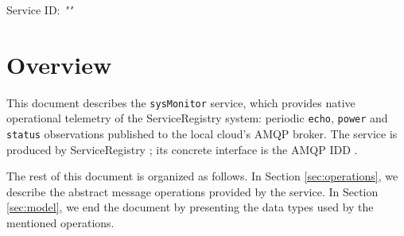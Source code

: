 \documentclass[a4paper]{arrowhead}
\begin{document}
\sloppy

\ArrowheadSetup

\begin{center}
  \vspace*{1cm}
  \huge{\arrowtitle}

  \vspace*{0.2cm}
  \LARGE{\arrowtype}
  \vspace*{1cm}

  \Large{Service ID: \textit{"\arrowid"}}

  \vspace*{\fill}


  \vspace*{1cm}
  \vspace*{\fill}

  \begin{abstract}
    This document describes the native \texttt{sysMonitor} service, version 1.0.0, produced by the ServiceRegistry core system of Arrowhead 5.2.2.
  \end{abstract}

  \vspace*{1cm}
\end{center}

\newpage

\tableofcontents
\newpage

\section{Overview}
\label{sec:overview}

This document describes the \texttt{sysMonitor} service, which provides native operational telemetry of the ServiceRegistry system: periodic \texttt{echo}, \texttt{power} and \texttt{status} observations published to the local cloud's AMQP broker.
The service is produced by ServiceRegistry \cite{sr-sysd}; its concrete interface is the AMQP IDD \cite{sr-sysMonitor-amqp-idd}.

The rest of this document is organized as follows.
In Section \ref{sec:operations}, we describe the abstract message operations provided by the service.
In Section \ref{sec:model}, we end the document by presenting the data types used by the mentioned operations.
\end{document}
